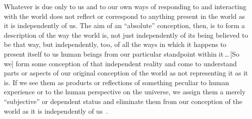 \documentclass[11pt]{standalone}
\newenvironment{squote}{%
	\begin{spacing}{1}
	\begin{list}{}{%
	\setlength{\labelwidth}{0pt}%
	\rightmargin\leftmargin%
	}
	\item\relax
	}{%
	\end{list}%
	\end{spacing}
	}
\begin{document}
\begin{spacing}{1.5}
\begin{squote}
Whatever is due only to us and to our own ways of responding to and
interacting with the world does not reflect or correspond to anything
present in the world as it is independently of us.  The aim of an
``absolute'' conception, then, is to form a description of the way the
world is, not just independently of its being believed to be that way,
but independently, too, of all the ways in which it happens to present
itself to us human beings from our particular standpoint within
it\,\ldots\,[So we] form some conception of that independent reality
and come to understand parts or aspects of our original conception of
the world as not representing it as it is.  If we see them as products
or reflections of something peculiar to human experience or to the
human perspective on the universe, we assign them a merely
``subjective'' or dependent status and eliminate them from our
conception of the world as it is independently of
us~\citep[30--31]{stroud2000a}.
\end{squote}

\begin{comment}
\section{Denials}
Every so often a philosopher will claim that some aspect of
what we take to be our world is somehow illusory, bogus, or simply
nonexistent.  This sort of denial will take various forms.  

One might claim that a certain phenomenon does indeed find expression
in the world, but that it is somehow subjective; without humans to
experience it, there would be no such phenomena.  Some philosophers
think colors are subjective in this way.

Or one might claim that some ordinary object of experience is actually
non-existent.  Peter van Inwagen claims that chairs do not exist.  He
recognizes, of course, that most of us believe that there are chairs
and think that we do talk and have beliefs about them; moreover, he
admits that when we say things like ``there is another chair
upstairs'' or ``there are five chairs in the meeting-room'' we often
say true things.  van Inwagen must therefore explain what we are
thinking and talking about, if not chairs.  In addition he must
explain {\em why} we believe there to be chairs.  When giving these
explanations, of course, he must make reference only to those things
that he \emph{does} take to exist.  We will look at his strategy more
closely in sections~\ref{paraphrase} and~\ref{inwagen}.


\end{comment}
\end{spacing}
\end{document}
